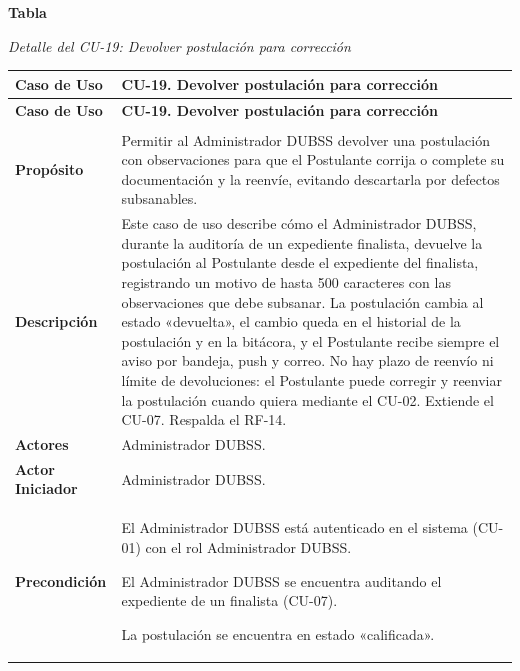 \label{tab:detalle_cu19}
\noindent\textbf{Tabla~\thetable}\par\nopagebreak
\noindent\textit{Detalle del CU-19: Devolver postulación para corrección}\par\nopagebreak
\begingroup\small\linespread{1}\selectfont
\begin{longtable}{>{\raggedright\arraybackslash}p{2.9cm} >{\raggedright\arraybackslash}p{12.6cm}}
\toprule
\textbf{Caso de Uso} & \textbf{CU-19. Devolver postulación para corrección} \\
\midrule
\endfirsthead
\toprule
\textbf{Caso de Uso} & \textbf{CU-19. Devolver postulación para corrección} \\
\midrule
\endhead
\endfoot
\bottomrule
\multicolumn{2}{l}{\textit{Nota.} Elaboración propia.} \\
\endlastfoot
\textbf{Propósito} & Permitir al Administrador DUBSS devolver una postulación con observaciones para que el Postulante corrija o complete su documentación y la reenvíe, evitando descartarla por defectos subsanables. \\
\midrule
\textbf{Descripción} & Este caso de uso describe cómo el Administrador DUBSS, durante la auditoría de un expediente finalista, devuelve la postulación al Postulante desde el expediente del finalista, registrando un motivo de hasta 500 caracteres con las observaciones que debe subsanar. La postulación cambia al estado «devuelta», el cambio queda en el historial de la postulación y en la bitácora, y el Postulante recibe siempre el aviso por bandeja, push y correo. No hay plazo de reenvío ni límite de devoluciones: el Postulante puede corregir y reenviar la postulación cuando quiera mediante el CU-02. Extiende el CU-07. Respalda el RF-14. \\
\midrule
\textbf{Actores} & Administrador DUBSS. \\
\midrule
\textbf{Actor Iniciador} & Administrador DUBSS. \\
\midrule
\textbf{Precondición} & \vspace{-\baselineskip}\begin{cuvin}
    \item El Administrador DUBSS está autenticado en el sistema (CU-01) con el rol Administrador DUBSS.
    \item El Administrador DUBSS se encuentra auditando el expediente de un finalista (CU-07).
    \item La postulación se encuentra en estado «calificada».

\end{cuvin}
\end{longtable}
